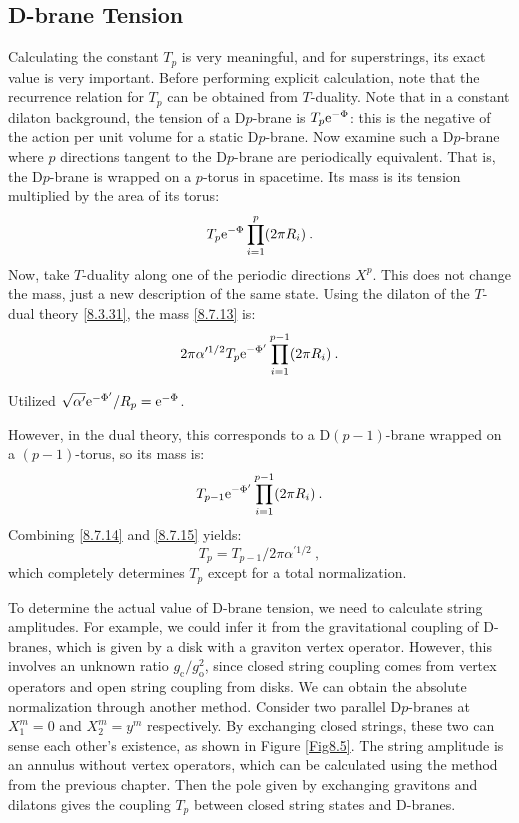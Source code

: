 \subsection*{D-brane Tension}
Calculating the constant $T_{p}$ is very meaningful, and for superstrings, its exact value is very important. Before performing explicit calculation, note that the recurrence relation for $T_{p}$ can be obtained from $T$-duality. 
Note that in a constant dilaton background, the tension of a D$p$-brane is $T_{p} \mathrm{e}^{-\Phi}$: this is the negative of the action per unit volume for a static D$p$-brane. 
Now examine such a D$p$-brane where $p$ directions tangent to the D$p$-brane are periodically equivalent. That is, the D$p$-brane is wrapped on a $p$-torus in spacetime. Its mass is its tension multiplied by the area of its torus:
\begin{equation}
	T_{p} \mathrm{e}^{-\Phi} \prod_{i=1}^{p}(2 \pi R_{i}) \:. \label{8.7.13}
\end{equation}
Now, take $T$-duality along one of the periodic directions $X^{p}$. 
This does not change the mass, just a new description of the same state. Using the dilaton of the $T$-dual theory \eqref{8.3.31}, the mass \eqref{8.7.13} is:
\begin{equation}
	2 \pi \alpha^{\prime 1/2} T_{p} \mathrm{e}^{-\Phi^{\prime}} \prod_{i=1}^{p-1}(2 \pi R_{i}) \:. \label{8.7.14}
\end{equation}
\begin{tcolorbox}
	\begin{remark}
		Utilized $\sqrt{\alpha^\prime}\mathrm{e}^{-\Phi^\prime}/R_p=\mathrm{e}^{-\Phi}$.
	\end{remark}	
\end{tcolorbox}
\noindent However, in the dual theory, this corresponds to a $\mathrm{D}(p{-}1)$-brane wrapped on a $(p{-}1)$-torus, so its mass is:
\begin{equation}
	T_{p-1} \mathrm{e}^{-\Phi^{\prime}} \prod_{i=1}^{p-1}(2 \pi R_{i}) \:. \label{8.7.15}
\end{equation}
Combining \eqref{8.7.14} and \eqref{8.7.15} yields:
\begin{equation}
	T_{p}=T_{p-1} / 2 \pi \alpha^{\prime 1/2} \:, \label{8.7.16}
\end{equation}
which completely determines $T_{p}$ except for a total normalization.

To determine the actual value of D-brane tension, we need to calculate string amplitudes. For example, we could infer it from the gravitational coupling of D-branes, which is given by a disk with a graviton vertex operator. 
However, this involves an unknown ratio $g_{\mathrm{c}} / g_{\mathrm{o}}^{2}$, since closed string coupling comes from vertex operators and open string coupling from disks. 
We can obtain the absolute normalization through another method. Consider two parallel D$p$-branes at $X_{1}^{m}=0$ and $X_{2}^{m}=y^{m}$ respectively. 
By exchanging closed strings, these two can sense each other's existence, as shown in Figure \ref{Fig8.5}. The string amplitude is an annulus without vertex operators, which can be calculated using the method from the previous chapter. 
Then the pole given by exchanging gravitons and dilatons gives the coupling $T_{p}$ between closed string states and D-branes.


